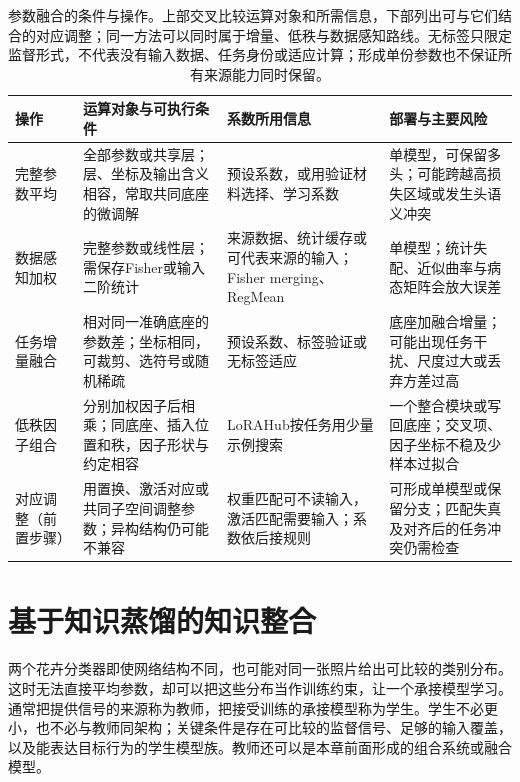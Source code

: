 \begin{table}[htbp]
  \centering
  \small
  \setlength{\tabcolsep}{4pt}
  \renewcommand{\arraystretch}{1.2}
  \begin{tabularx}{\linewidth}{@{}>{\raggedright\arraybackslash}p{24mm}
      >{\raggedright\arraybackslash}X
      >{\raggedright\arraybackslash}X
      >{\raggedright\arraybackslash}X@{}}
    \toprule
    操作 & 运算对象与可执行条件 & 系数所用信息 & 部署与主要风险 \\
    \midrule
    完整参数平均 & 全部参数或共享层；层、坐标及输出含义相容，常取共同底座的微调解 & 预设系数，或用验证材料选择、学习系数 & 单模型，可保留多头；可能跨越高损失区域或发生头语义冲突 \\
    \addlinespace
    数据感知加权 & 完整参数或线性层；需保存Fisher或输入二阶统计 & 来源数据、统计缓存或可代表来源的输入；Fisher merging、RegMean & 单模型；统计失配、近似曲率与病态矩阵会放大误差 \\
    \addlinespace
    任务增量融合 & 相对同一准确底座的参数差；坐标相同，可裁剪、选符号或随机稀疏 & 预设系数、标签验证或无标签适应 & 底座加融合增量；可能出现任务干扰、尺度过大或丢弃方差过高 \\
    \addlinespace
    低秩因子组合 & 分别加权因子后相乘；同底座、插入位置和秩，因子形状与约定相容 & LoRAHub按任务用少量示例搜索 & 一个整合模块或写回底座；交叉项、因子坐标不稳及少样本过拟合 \\
    \midrule
    对应调整（前置步骤） & 用置换、激活对应或共同子空间调整参数；异构结构仍可能不兼容 & 权重匹配可不读输入，激活匹配需要输入；系数依后接规则 & 可形成单模型或保留分支；匹配失真及对齐后的任务冲突仍需检查 \\
    \bottomrule
  \end{tabularx}
  \caption{参数融合的条件与操作。上部交叉比较运算对象和所需信息，下部列出可与它们结合的对应调整；同一方法可以同时属于增量、低秩与数据感知路线。无标签只限定监督形式，不代表没有输入数据、任务身份或适应计算；形成单份参数也不保证所有来源能力同时保留。}
  \label{tab:ket-integration-merging-operations}
\end{table}

\section{基于知识蒸馏的知识整合}
\label{sec:ket-integration-distillation}

两个花卉分类器即使网络结构不同，也可能对同一张照片给出可比较的类别分布。这时无法直接平均参数，却可以把这些分布当作训练约束，让一个承接模型学习。通常把提供信号的来源称为教师，把接受训练的承接模型称为学生。学生不必更小，也不必与教师同架构；关键条件是存在可比较的监督信号、足够的输入覆盖，以及能表达目标行为的学生模型族。教师还可以是本章前面形成的组合系统或融合模型。

